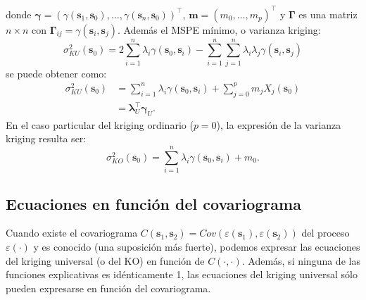 \documentclass[
  spanish,
]{book}
\theoremstyle{break}
\theoremstyle{definition}
\theoremstyle{definition}
\theoremstyle{definition}
\theoremstyle{definition}
\theoremstyle{remark}
\begin{document}
donde \(\boldsymbol{\gamma}=\left( \gamma(\mathbf{s}_{1},\mathbf{s}_{0}), \ldots, \gamma(\mathbf{s}_{n} ,\mathbf{s}_{0})\right)^\top\), \(\mathbf{m}=\left(m_{0}, \ldots,m_{p} \right)^\top\) y \(\boldsymbol{\Gamma}\) es una matriz \(n\times n\) con \(\boldsymbol{\Gamma}_{ij} = \gamma(\mathbf{s}_{i}, \mathbf{s}_{j})\).
Además el MSPE mínimo, o varianza kriging:
\[\sigma_{KU}^{2} (\mathbf{s}_{0})=2\sum\limits_{i=1}^{n}\lambda_{i} 
\gamma(\mathbf{s}_{0},\mathbf{s}_{i}
)-\sum\limits_{i=1}^{n}\sum\limits_{j=1}^{n}\lambda_{i}  \lambda_{j}
\gamma(\mathbf{s}_{i},\mathbf{s}_{j} )\]
se puede obtener como:
\[\begin{aligned}
\sigma_{KU}^{2} (\mathbf{s}_{0})
& =\sum\limits_{i=1}^{n}\lambda_{i} \gamma(\mathbf{s}_{0},\mathbf{s}_{i})+\sum\limits_{j=0}^{p}m_{j} X_{j}
(\mathbf{s}_{0}) \\
& =\boldsymbol{\lambda}_{U}^\top \boldsymbol{\gamma}_{U}.
\end{aligned}\]
En el caso particular del kriging ordinario (\(p=0\)), la expresión de la varianza kriging resulta ser:
\[\sigma_{KO}^{2} (\mathbf{s}_{0})=\sum\limits_{i=1}^{n}\lambda_{i} 
\gamma(\mathbf{s}_{0},\mathbf{s}_{i})+m_{0}.\]

\hypertarget{ku-covariograma}{%
\subsection{Ecuaciones en función del covariograma}\label{ku-covariograma}}

Cuando existe el covariograma \(C(\mathbf{s}_{1},\mathbf{s}_{2}) = Cov(\varepsilon(\mathbf{s}_{1}), \varepsilon(\mathbf{s}_{2}))\) del proceso \(\varepsilon(\cdot)\) y es conocido (una suposición más fuerte), podemos expresar las ecuaciones del kriging universal (o del KO) en función de \(C(\cdot,\cdot)\).
Además, si ninguna de las funciones explicativas es idénticamente 1, las ecuaciones del kriging universal sólo pueden expresarse en función del covariograma.
\end{document}
